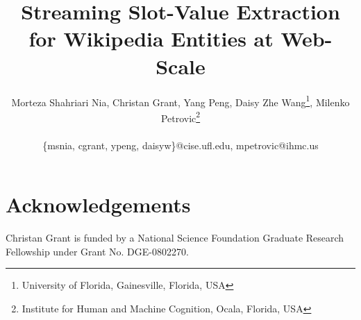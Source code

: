 \documentclass[letterpaper]{article}
\begin{document}
\title{Streaming Slot-Value Extraction for Wikipedia Entities at Web-Scale}





\author{Morteza Shahriari Nia, Christan Grant, Yang Peng, Daisy Zhe Wang\footnote{University of Florida, Gainesville, Florida, USA}, Milenko Petrovic\footnote{Institute for Human and Machine Cognition, Ocala, Florida, USA}\\
       \\
       {\{msnia, cgrant, ypeng, daisyw\}@cise.ufl.edu,}
       {mpetrovic@ihmc.us}
}

\maketitle







%







\section*{Acknowledgements}
Christan Grant is funded by a National Science Foundation Graduate Research Fellowship under Grant No. DGE-0802270. 

%
%




%
\end{document}
